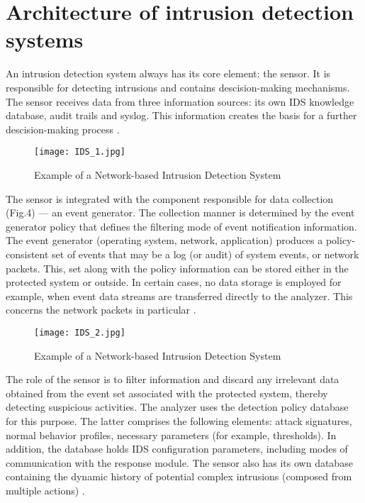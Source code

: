 \section{Architecture of intrusion detection systems}

An intrusion detection system always has its core element: the sensor. It is responsible for detecting intrusions and contains descision-making mechanisms. The sensor receives data from three information sources: its own IDS knowledge database, audit trails and syslog. This information creates the basis for a further descision-making process \citep{windowssecurity}.

\begin{figure}[h]
    \centering
    \texttt{[image: IDS\_1.jpg]}
    \caption{Example of a Network-based Intrusion Detection System}
    \label{fig:NIDS}
\end{figure}

The sensor is integrated with the component responsible for data collection (Fig.4) — an event generator. The collection manner is determined by the event generator policy that defines the filtering mode of event notification information. The event generator (operating system, network, application) produces a policy-consistent set of events that may be a log (or audit) of system events, or network packets. This, set along with the policy information can be stored either in the protected system or outside. In certain cases, no data storage is employed for example, when event data streams are transferred directly to the analyzer. This concerns the network packets in particular \citep{windowssecurity1}.

\begin{figure}[h]
    \centering
    \texttt{[image: IDS\_2.jpg]}
    \caption{Example of a Network-based Intrusion Detection System}
    \label{fig:NIDS}
\end{figure}

The role of the sensor is to filter information and discard any irrelevant data obtained from the event set associated with the protected system, thereby detecting suspicious activities. The analyzer uses the detection policy database for this purpose. The latter comprises the following elements: attack signatures, normal behavior profiles, necessary parameters (for example, thresholds). In addition, the database holds IDS configuration parameters, including modes of communication with the response module. The sensor also has its own database containing the dynamic history of potential complex intrusions (composed from multiple actions) \citep{windowssecurity1}.

